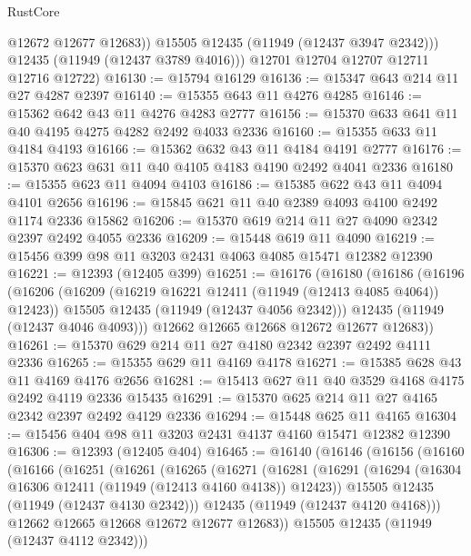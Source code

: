 \begin{lexlean}{RustCore}
\begin{coremodule}
              @12672
              @12677
              @12683))
          @15505
          @12435
          (@11949 (@12437 @3947 @2342)))
        @12435
        (@11949 (@12437 @3789 @4016)))
      @12701
      @12704
      @12707
      @12711
      @12716
      @12722)
@16130 := @15794 @16129
@16136 := @15347 @643 @214 @11 @27 @4287 @2397
@16140 := @15355 @643 @11 @4276 @4285
@16146 := @15362 @642 @43 @11 @4276 @4283 @2777
@16156 := @15370 @633 @641 @11 @40 @4195 @4275 @4282 @2492 @4033 @2336
@16160 := @15355 @633 @11 @4184 @4193
@16166 := @15362 @632 @43 @11 @4184 @4191 @2777
@16176 := @15370 @623 @631 @11 @40 @4105 @4183 @4190 @2492 @4041 @2336
@16180 := @15355 @623 @11 @4094 @4103
@16186 := @15385 @622 @43 @11 @4094 @4101 @2656
@16196 := @15845 @621 @11 @40 @2389 @4093 @4100 @2492 @1174 @2336 @15862
@16206 := @15370 @619 @214 @11 @27 @4090 @2342 @2397 @2492 @4055 @2336
@16209 := @15448 @619 @11 @4090
@16219 := @15456 @399 @98 @11 @3203 @2431 @4063 @4085 @15471 @12382 @12390
@16221 := @12393 (@12405 @399)
@16251 := @16176
    (@16180
      (@16186
        (@16196
          (@16206
            (@16209 (@16219 @16221 @12411 (@11949 (@12413 @4085 @4064)) @12423))
            @15505
            @12435
            (@11949 (@12437 @4056 @2342)))
          @12435
          (@11949 (@12437 @4046 @4093)))
        @12662
        @12665
        @12668
        @12672
        @12677
        @12683))
@16261 := @15370 @629 @214 @11 @27 @4180 @2342 @2397 @2492 @4111 @2336
@16265 := @15355 @629 @11 @4169 @4178
@16271 := @15385 @628 @43 @11 @4169 @4176 @2656
@16281 := @15413 @627 @11 @40 @3529 @4168 @4175 @2492 @4119 @2336 @15435
@16291 := @15370 @625 @214 @11 @27 @4165 @2342 @2397 @2492 @4129 @2336
@16294 := @15448 @625 @11 @4165
@16304 := @15456 @404 @98 @11 @3203 @2431 @4137 @4160 @15471 @12382 @12390
@16306 := @12393 (@12405 @404)
@16465 := @16140
    (@16146
      (@16156
        (@16160
          (@16166
            (@16251
              (@16261
                (@16265
                  (@16271
                    (@16281
                      (@16291
                        (@16294 (@16304 @16306 @12411 (@11949 (@12413 @4160 @4138)) @12423))
                        @15505
                        @12435
                        (@11949 (@12437 @4130 @2342)))
                      @12435
                      (@11949 (@12437 @4120 @4168)))
                    @12662
                    @12665
                    @12668
                    @12672
                    @12677
                    @12683))
                @15505
                @12435
                (@11949 (@12437 @4112 @2342)))

\end{coremodule}
\end{lexlean}
